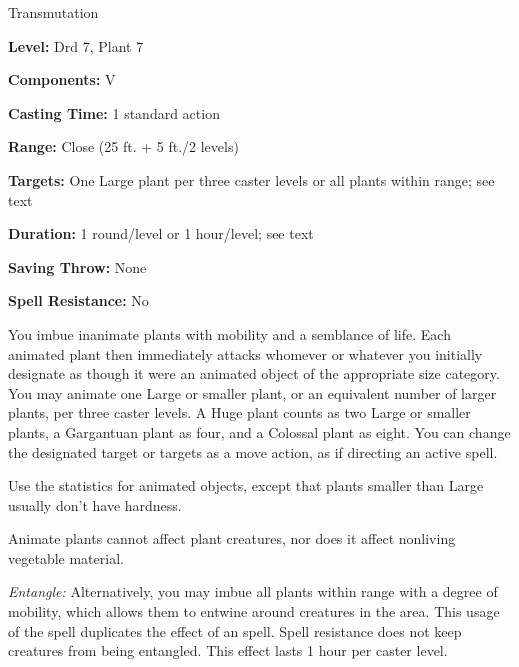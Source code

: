 
Transmutation

\textbf{Level:} Drd 7, Plant 7

\textbf{Components:} V

\textbf{Casting Time:} 1 standard action

\textbf{Range:} Close (25 ft. + 5 ft./2 levels)

\textbf{Targets:} One Large plant per three caster levels or all plants within 
range; see text

\textbf{Duration:} 1 round/level or 1 hour/level; see text

\textbf{Saving Throw:} None

\textbf{Spell Resistance:} No

You imbue inanimate plants with mobility and a semblance of life. Each animated 
plant then immediately attacks whomever or whatever you initially designate as 
though it were an animated object of the appropriate size category. You may animate 
one Large or smaller plant, or an equivalent number of larger plants, per three 
caster levels. A Huge plant counts as two Large or smaller plants, a Gargantuan 
plant as four, and a Colossal plant as eight. You can change the designated target 
or targets as a move action, as if directing an active spell.

Use the statistics for animated objects, except that plants smaller than 
Large usually don't have hardness.

Animate plants cannot affect plant creatures, nor does it affect nonliving 
vegetable material.

\textit{Entangle:} Alternatively, you may imbue all plants within range with a 
degree of mobility, which allows them to entwine around creatures in the area. 
This usage of the spell duplicates the effect of an  spell. Spell 
resistance does not keep creatures from being entangled. This effect lasts 1 hour 
per caster level.

